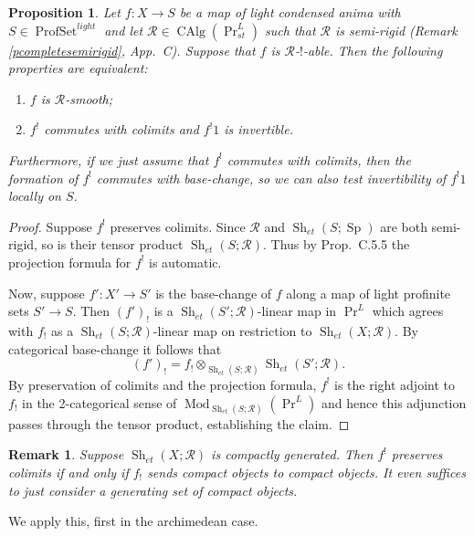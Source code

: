 \documentclass[12pt]{article}
\newtheorem{proposition}[theorem]{Proposition}
\newtheorem{remark}[theorem]{Remark}
\newcommand{\on}{\operatorname}
\newcommand{\mc}{\mathcal}
\begin{document}
\begin{proposition}\label{smoothlemma}
Let $f:X\to S$ be a map of light condensed anima with $S\in\on{ProfSet}^{light}$ and let $\mathcal{R}\in\on{CAlg}(\on{Pr}^L_{st})$ such that $\mathcal{R}$ is \emph{semi-rigid} (Remark \ref{pcompletesemirigid}, \cite{ArinkinLanglands} App.\ C).  Suppose that $f$ is $\mathcal{R}$-$!$-able.  Then the following properties are equivalent:

\begin{enumerate}
\item $f$ is $\mathcal{R}$-smooth;
\item $f^!$ commutes with colimits and $f^!1$ is invertible.
\end{enumerate}

Furthermore, if we just assume that $f^!$ commutes with colimits, then the formation of $f^!$ commutes with base-change, so we can also test invertibility of $f^!1$ locally on $S$.
\end{proposition}
\begin{proof}
Suppose $f^!$ preserves colimits.  Since $\mathcal{R}$ and $\on{Sh}_{et}(S;\on{Sp})$ are both semi-rigid, so is their tensor product $\on{Sh}_{et}(S;\mc{R})$.  Thus by \cite{ArinkinLanglands} Prop.\ C.5.5 the projection formula for $f^!$ is automatic.

Now, suppose $f':X'\to S'$ is the base-change of $f$ along a map of light profinite sets $S'\to S$.  Then $(f')_!$ is a $\on{Sh}_{et}(S';\mathcal{R})$-linear map in $\on{Pr}^L$ which agrees with $f_!$ as a $\on{Sh}_{et}(S;\mathcal{R})$-linear map on restriction to $\on{Sh}_{et}(X;\mathcal{R})$.  By categorical base-change it follows that
$$(f')_! = f_! \otimes_{\on{Sh}_{et}(S;\mathcal{R})}\on{Sh}_{et}(S';\mathcal{R}).$$
By preservation of colimits and the projection formula, $f^!$ is the right adjoint to $f_!$ in the 2-categorical sense of $\on{Mod}_{\on{Sh}_{et}(S;\mathcal{R})}(\on{Pr}^L)$ and hence this adjunction passes through the tensor product, establishing the claim.
\end{proof}

\begin{remark}\label{smoothremark}
Suppose $\on{Sh}_{et}(X;\mc{R})$ is compactly generated.  Then $f^!$ preserves colimits if and only if $f_!$ sends compact objects to compact objects.  It even suffices to just consider a generating set of compact objects.
\end{remark}

We apply this, first in the archimedean case.
\end{document}
